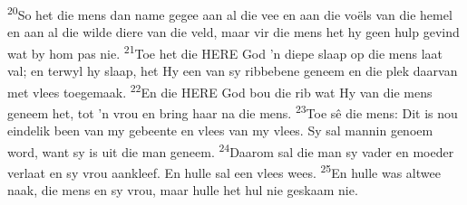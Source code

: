 \documentclass[10pt,oneside,a4paper]{memoir}
\renewcommand{\verse}[1]{\textsuperscript{#1}}
\begin{document}
\begin{paracol}{2}
\verse{20}So het die mens dan name gegee aan al die vee en aan die voëls van die hemel en aan al die wilde diere van die veld, maar vir die mens het hy geen hulp gevind wat by hom pas nie.
\verse{21}Toe het die HERE God ’n diepe slaap op die mens laat val; en terwyl hy slaap, het Hy een van sy ribbebene geneem en die plek daarvan met vlees toegemaak.
\verse{22}En die HERE God bou die rib wat Hy van die mens geneem het, tot ’n vrou en bring haar na die mens.
\verse{23}Toe sê die mens: Dit is nou eindelik been van my gebeente en vlees van my vlees. Sy sal mannin genoem word, want sy is uit die man geneem.
\verse{24}Daarom sal die man sy vader en moeder verlaat en sy vrou aankleef. En hulle sal een vlees wees.
\verse{25}En hulle was altwee naak, die mens en sy vrou, maar hulle het hul nie geskaam nie.


\end{paracol}
\end{document}
